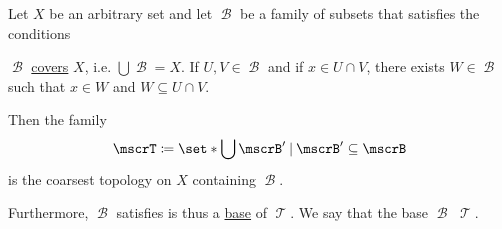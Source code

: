 \begin{proposition}\label{thm:topology_from_base}
  Let \( X \) be an arbitrary set and let \( \mscrB \) be a family of subsets that satisfies the conditions
  \begin{thmenum}
     \( \mscrB \) \hyperref[def:set_partition]{covers} \( X \), i.e. \( \bigcup \mscrB = X \).
     If \( U, V \in \mscrB \) and if \( x \in U \cap V \), there exists \( W \in \mscrB \) such that \( x \in W \) and \( W \subseteq U \cap V \).
  \end{thmenum}

  Then the family
  \begin{equation}\label{eq:thm:topology_from_base/topology}
    \mscrT \coloneqq \set*{ \bigcup \mscrB' \given \mscrB' \subseteq \mscrB }
  \end{equation}
  is the coarsest topology on \( X \) containing \( \mscrB \).

  Furthermore, \( \mscrB \) satisfies  is thus a \hyperref[def:topological_base]{base} of \( \mscrT \). We say that the base \( \mscrB \)  \( \mscrT \).
\end{proposition}
